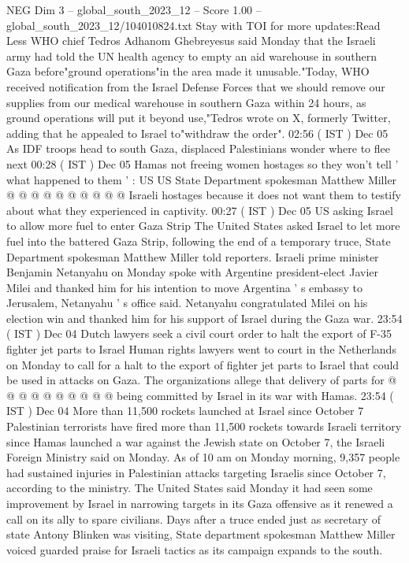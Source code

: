 \begin{textsample}{NEG Dim 3 – global\_south\_2023\_12 – Score 1.00 – global\_south\_2023\_12/104010824.txt}
Stay with TOI for more updates:Read Less WHO chief Tedros Adhanom Ghebreyesus said Monday that the Israeli army had told the UN health agency to empty an aid warehouse in southern Gaza before"ground operations"in the area made it unusable."Today, WHO received notification from the Israel Defense Forces that we should remove our supplies from our medical warehouse in southern Gaza within 24 hours, as ground operations will put it beyond use,"Tedros wrote on X, formerly Twitter, adding that he appealed to Israel to"withdraw the order". 02:56 ( IST ) Dec 05 As IDF troops head to south Gaza, displaced Palestinians wonder where to flee next 00:28 ( IST ) Dec 05 Hamas not freeing women hostages so they won't tell ' what happened to them ' : US US State Department spokesman Matthew Miller @ @ @ @ @ @ @ @ @ @ Israeli hostages because it does not want them to testify about what they experienced in captivity. 00:27 ( IST ) Dec 05 US asking Israel to allow more fuel to enter Gaza Strip The United States asked Israel to let more fuel into the battered Gaza Strip, following the end of a temporary truce, State Department spokesman Matthew Miller told reporters.
Israeli prime minister Benjamin Netanyahu on Monday spoke with Argentine president-elect Javier Milei and thanked him for his intention to move Argentina ' s embassy to Jerusalem, Netanyahu ' s office said.
Netanyahu congratulated Milei on his election win and thanked him for his support of Israel during the Gaza war. 23:54 ( IST ) Dec 04 Dutch lawyers seek a civil court order to halt the export of F-35 fighter jet parts to Israel Human rights lawyers went to court in the Netherlands on Monday to call for a halt to the export of fighter jet parts to Israel that could be used in attacks on Gaza.
The organizations allege that delivery of parts for @ @ @ @ @ @ @ @ @ @ being committed by Israel in its war with Hamas. 23:54 ( IST ) Dec 04 More than 11,500 rockets launched at Israel since October 7 Palestinian terrorists have fired more than 11,500 rockets towards Israeli territory since Hamas launched a war against the Jewish state on October 7, the Israeli Foreign Ministry said on Monday.
As of 10 am on Monday morning, 9,357 people had sustained injuries in Palestinian attacks targeting Israelis since October 7, according to the ministry.
The United States said Monday it had seen some improvement by Israel in narrowing targets in its Gaza offensive as it renewed a call on its ally to spare civilians.
Days after a truce ended just as secretary of state Antony Blinken was visiting, State department spokesman Matthew Miller voiced guarded praise for Israeli tactics as its campaign expands to the south.

\end{textsample}
